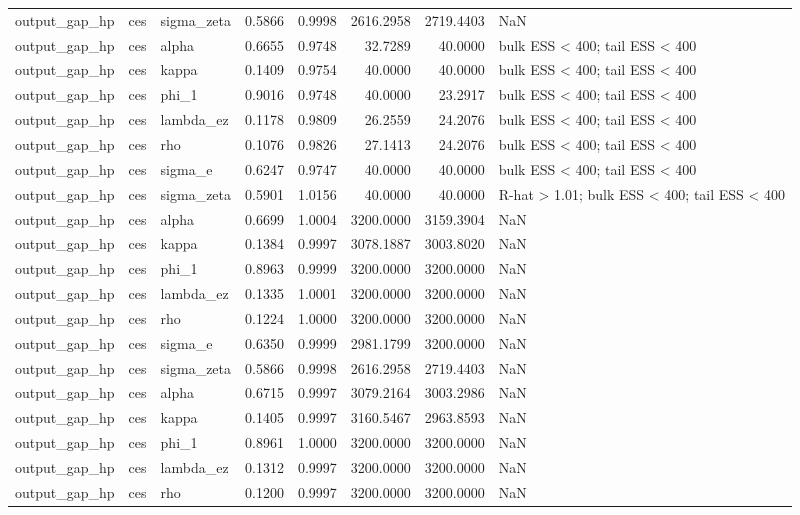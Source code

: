 \begin{tabular}{lllrrrrl}
output\_gap\_hp & ces & sigma\_zeta & 0.5866 & 0.9998 & 2616.2958 & 2719.4403 & NaN \\
output\_gap\_hp & ces & alpha & 0.6655 & 0.9748 & 32.7289 & 40.0000 & bulk ESS < 400; tail ESS < 400 \\
output\_gap\_hp & ces & kappa & 0.1409 & 0.9754 & 40.0000 & 40.0000 & bulk ESS < 400; tail ESS < 400 \\
output\_gap\_hp & ces & phi\_1 & 0.9016 & 0.9748 & 40.0000 & 23.2917 & bulk ESS < 400; tail ESS < 400 \\
output\_gap\_hp & ces & lambda\_ez & 0.1178 & 0.9809 & 26.2559 & 24.2076 & bulk ESS < 400; tail ESS < 400 \\
output\_gap\_hp & ces & rho & 0.1076 & 0.9826 & 27.1413 & 24.2076 & bulk ESS < 400; tail ESS < 400 \\
output\_gap\_hp & ces & sigma\_e & 0.6247 & 0.9747 & 40.0000 & 40.0000 & bulk ESS < 400; tail ESS < 400 \\
output\_gap\_hp & ces & sigma\_zeta & 0.5901 & 1.0156 & 40.0000 & 40.0000 & R-hat > 1.01; bulk ESS < 400; tail ESS < 400 \\
output\_gap\_hp & ces & alpha & 0.6699 & 1.0004 & 3200.0000 & 3159.3904 & NaN \\
output\_gap\_hp & ces & kappa & 0.1384 & 0.9997 & 3078.1887 & 3003.8020 & NaN \\
output\_gap\_hp & ces & phi\_1 & 0.8963 & 0.9999 & 3200.0000 & 3200.0000 & NaN \\
output\_gap\_hp & ces & lambda\_ez & 0.1335 & 1.0001 & 3200.0000 & 3200.0000 & NaN \\
output\_gap\_hp & ces & rho & 0.1224 & 1.0000 & 3200.0000 & 3200.0000 & NaN \\
output\_gap\_hp & ces & sigma\_e & 0.6350 & 0.9999 & 2981.1799 & 3200.0000 & NaN \\
output\_gap\_hp & ces & sigma\_zeta & 0.5866 & 0.9998 & 2616.2958 & 2719.4403 & NaN \\
output\_gap\_hp & ces & alpha & 0.6715 & 0.9997 & 3079.2164 & 3003.2986 & NaN \\
output\_gap\_hp & ces & kappa & 0.1405 & 0.9997 & 3160.5467 & 2963.8593 & NaN \\
output\_gap\_hp & ces & phi\_1 & 0.8961 & 1.0000 & 3200.0000 & 3200.0000 & NaN \\
output\_gap\_hp & ces & lambda\_ez & 0.1312 & 0.9997 & 3200.0000 & 3200.0000 & NaN \\
output\_gap\_hp & ces & rho & 0.1200 & 0.9997 & 3200.0000 & 3200.0000 & NaN \\

\end{tabular}
